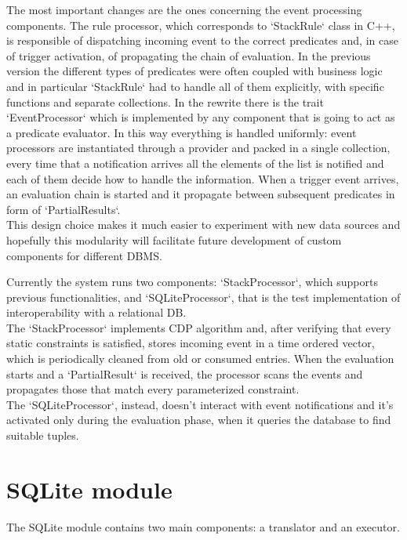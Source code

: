 The most important changes are the ones concerning the event processing components. The rule processor, which corresponds to `StackRule` class in C++, is responsible of dispatching incoming event to the correct predicates and, in case of trigger activation, of propagating the chain of evaluation. In the previous version the different types of predicates were often coupled with business logic and in particular `StackRule` had to handle all of them explicitly, with specific functions and separate collections. In the rewrite there is the trait `EventProcessor` which is implemented by any component that is going to act as a predicate evaluator. In this way everything is handled uniformly: event processors are instantiated through a provider and packed in a single collection, every time that a notification arrives all the elements of the list is notified and each of them decide how to handle the information. When a trigger event arrives, an evaluation chain is started and it propagate between subsequent predicates in form of `PartialResults`.\\
This design choice makes it much easier to experiment with new data sources and hopefully this modularity will facilitate future development of custom components for different DBMS.

Currently the system runs two components: `StackProcessor`, which supports previous functionalities, and `SQLiteProcessor`, that is the test implementation of interoperability with a relational DB.\\
The `StackProcessor` implements CDP algorithm and, after verifying that every static constraints is satisfied, stores incoming event in a time ordered vector, which is periodically cleaned from old or consumed entries. When the evaluation starts and a `PartialResult` is received, the processor scans the events and propagates those that match every parameterized constraint.\\
The `SQLiteProcessor`, instead, doesn't interact with event notifications and it's activated only during the evaluation phase, when it queries the database to find suitable tuples.

\section{SQLite module}
The SQLite module contains two main components: a translator and an executor.

